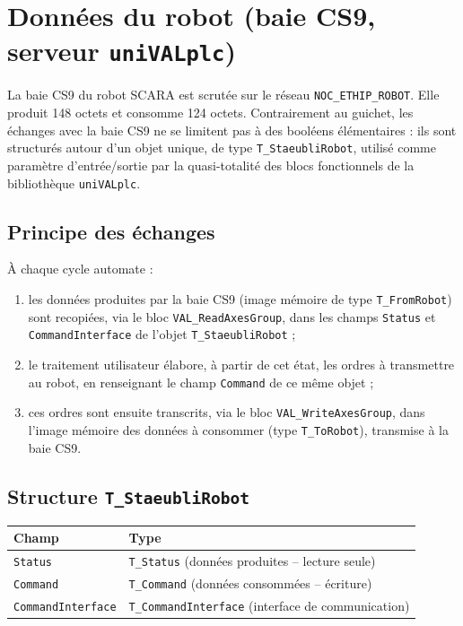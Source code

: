 \section{Données du robot (baie CS9, serveur \texttt{uniVALplc})}
\label{secDonneesRobot}

La baie CS9 du robot SCARA est scrutée sur le réseau
\texttt{NOC\_ETHIP\_ROBOT}. Elle produit 148 octets et consomme 124 octets.
Contrairement au guichet, les échanges avec la baie CS9 ne se limitent pas à
des booléens élémentaires : ils sont structurés autour d'un objet unique,
de type \texttt{T\_StaeubliRobot}, utilisé comme paramètre d'entrée/sortie
par la quasi-totalité des blocs fonctionnels de la bibliothèque
\texttt{uniVALplc}.


\subsection{Principe des échanges}

À chaque cycle automate :
\begin{enumerate}
    \item les données produites par la baie CS9 (image mémoire de type
    \texttt{T\_FromRobot}) sont recopiées, via le bloc
    \texttt{VAL\_ReadAxesGroup}, dans les champs \texttt{Status} et
    \texttt{CommandInterface} de l'objet \texttt{T\_StaeubliRobot} ;
    \item le traitement utilisateur élabore, à partir de cet état, les
    ordres à transmettre au robot, en renseignant le champ
    \texttt{Command} de ce même objet ;
    \item ces ordres sont ensuite transcrits, via le bloc
    \texttt{VAL\_WriteAxesGroup}, dans l'image mémoire des données à
    consommer (type \texttt{T\_ToRobot}), transmise à la baie CS9.
\end{enumerate}

\subsection{Structure \texttt{T\_StaeubliRobot}}

\begin{center}
\begin{tabular}{|l|l|}
\hline
\textbf{Champ} & \textbf{Type} \\
\hline
\texttt{Status} & \texttt{T\_Status} (données produites -- lecture seule) \\
\hline
\texttt{Command} & \texttt{T\_Command} (données consommées -- écriture) \\
\hline
\texttt{CommandInterface} & \texttt{T\_CommandInterface} (interface de
communication) \\
\hline
\end{tabular}
\end{center}

